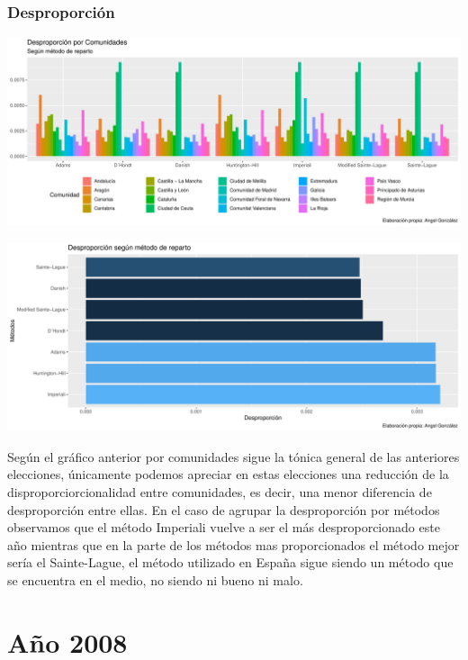 \documentclass[12pt,a4paper,]{book}
\numberwithin{dummy}{section}
\theoremstyle{ocrenumbox}
\theoremstyle{blacknumex}
\theoremstyle{blacknumbox}
\theoremstyle{ocrenum}
\theoremstyle{ocrenum}
\begin{document}
\hypertarget{desproporciuxf3n-8}{%
\subsubsection{Desproporción}\label{desproporciuxf3n-8}}

\begin{center}\includegraphics[width=0.95\linewidth]{figurasR/unnamed-chunk-84-1} \end{center}

\begin{center}\includegraphics[width=0.95\linewidth]{figurasR/unnamed-chunk-84-2} \end{center}

Según el gráfico anterior por comunidades sigue la tónica general de las
anteriores elecciones, únicamente podemos apreciar en estas elecciones
una reducción de la disproporciorcionalidad entre comunidades, es decir,
una menor diferencia de desproporción entre ellas. En el caso de agrupar
la desproporción por métodos observamos que el método Imperiali vuelve a
ser el más desproporcionado este año mientras que en la parte de los
métodos mas proporcionados el método mejor sería el Sainte-Lague, el
método utilizado en España sigue siendo un método que se encuentra en el
medio, no siendo ni bueno ni malo.

\hypertarget{auxf1o-2008}{%
\section{Año 2008}\label{auxf1o-2008}}
\end{document}
